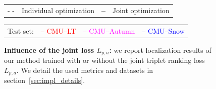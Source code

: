 \begin{figure}
\begin{minipage}{0.65\linewidth}
		\vspace{0.2cm}
		
			\setlength{\tabcolsep}{2pt}
			\begin{tabular}{c l c l}
				\Large{- -} & Individual optimization & \textbf{\Large{--}} & Joint optimization \\
			\end{tabular}			
			
			\begin{tabular}{c c c c}
				Test set: & \textcolor{red}{{--} CMU--LT} & \textcolor{magenta}{{--} CMU--Autumn} & \textcolor{blue}{{--} CMU--Snow} \\
			\end{tabular}			
		
	\end{minipage}\hfill
	\begin{minipage}{0.35\linewidth}
		\caption[Joint vs individual optimization]{\label{fig:fuse_desc} \textbf{Influence of the joint loss $L_{p,a}$:} we report localization results of our method trained with or without the joint triplet ranking loss $L_{p,a}$. We detail the used metrics and datasets in section~\ref{sec:impl_details}.}
	\end{minipage}	

\end{figure}
	